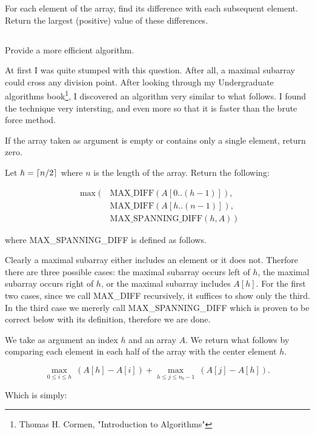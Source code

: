 \documentclass{amsart}
\theoremstyle{definition}
\theoremstyle{remark}
\numberwithin{equation}{section}
\DeclarePairedDelimiter{\ceil}{\lceil}{\rceil}
\begin{document}
For each element of the array, find its difference with each subsequent
element. Return the largest (positive) value of these differences.

\subsection{} Provide a more efficient algorithm.

At first I was quite stumped with this question. After all, a maximal
subarray could cross any division point. After looking through my
Undergraduate algorithms book\footnote{Thomas H. Cormen, "Introduction
to Algorithms"}, I discovered an algorithm very similar to what follows.
I found the technique very intersting, and even more so that it is
faster than the brute force method.


If the array taken as argument is empty or contains only a single element, return zero.

Let $h = \ceil{n/2}$ where $n$ is the length of the array. Return the following:

\begin{align*}
  \max(\ & \text{MAX\_DIFF}( A[0..(h-1)] ), \\
        & \text{MAX\_DIFF}( A[h..(n-1)] ), \\
        & \text{MAX\_SPANNING\_DIFF}( h, A)\ )
\end{align*}

where MAX\_SPANNING\_DIFF is defined as follows.

\proof 

Clearly a maximal subarray either includes an element or it does not.
Therfore there are three possible cases: the maximal subarray occurs
left of $h$, the maximal subarray occurs right of $h$, or the maximal
subarray includes $A[h]$. For the first two cases, since we call
MAX\_DIFF recursively, it suffices to show only the third. In the third
case we mererly call MAX\_SPANNING\_DIFF which is proven to be correct
below with its definition, therefore we are done.


We take as argument an index $h$ and an array $A$. We return what
follows by comparing each element in each half of the array with the
center element $h$.

$$ \max_{0 \leq i \leq h}\ (A[h] - A[i]) + \max_{h \leq j \leq n_b -1}\ (A[j] - A[h]). $$

Which is simply:
\end{document}

